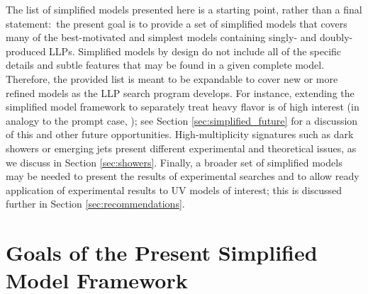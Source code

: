 The list of simplified models presented here is  a starting point, rather than a final statement:~the present goal is to provide a set of simplified models that covers many of the best-motivated and simplest models containing singly- and doubly-produced LLPs. Simplified models by design do not include all of the specific details and subtle features that may be found in a given complete model.  Therefore, the provided list is meant to be expandable to cover new or more refined models as the LLP search program develops.  For instance,  extending the simplified model framework to separately treat heavy flavor is of high interest (in analogy to the prompt case, \cite{Essig:2011qg}); see Section \ref{sec:simplified_future} for a discussion of this and other future opportunities.   High-multiplicity signatures such as dark showers or emerging jets present different experimental and theoretical issues, as we discuss in  Section \ref{sec:showers}. Finally, a broader set of simplified models may be needed to present the results of experimental searches and to allow ready application of experimental results to UV models of interest; this is discussed further in Section \ref{sec:recommendations}.




\section{Goals of the Present Simplified Model Framework}

